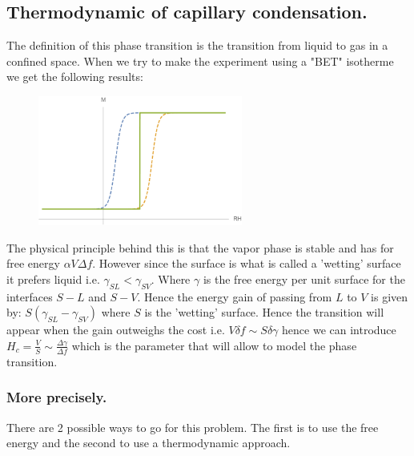 \documentclass[10pt,a4paper]{book}
\begin{document}
\subsection{Thermodynamic of capillary condensation.}
The definition of this phase transition is the transition from liquid to gas in a confined space. When we try to make the experiment using a "BET" isotherme we get the following results:
\begin{figure}[h!]
\centering
\includegraphics[width = 0.6\textwidth]{graphs/capillaryCondensationBET}
\end{figure}
The physical principle behind this is that the vapor phase is stable and has for free energy $\alpha V \Delta f$. However since the surface is what is called a 'wetting' surface it prefers liquid i.e. $\gamma_{SL} < \gamma_{SV}$. Where $\gamma$ is the free energy per unit surface for the interfaces $S-L$ and $S-V$. Hence the energy gain of passing from $L$ to $V$ is given by: $S (\gamma_{SL} - \gamma_{SV})$ where $S$ is the 'wetting' surface. Hence the transition will appear when the gain outweighs the cost i.e. $V \delta f \sim S \delta \gamma$ hence we can introduce $H_c = \frac{V}{S} \sim \frac{\Delta \gamma}{\Delta f}$ which is the parameter that will allow to model the phase transition.

\subsubsection{More precisely.}
There are 2 possible ways to go for this problem. The first is to use the free energy and the second to use a thermodynamic approach. 
\end{document}
